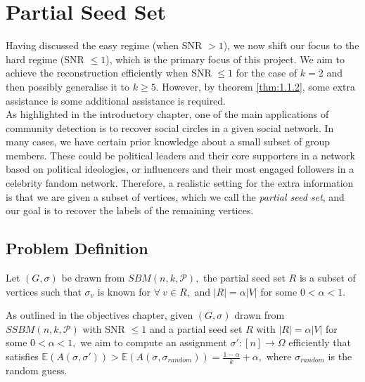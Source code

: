 \chapter{Partial Seed Set}\label{chapter:3}
Having discussed the easy regime (when SNR $>1$), we now shift our focus to the hard regime (SNR $\leq1$), which is the primary focus of this project. We aim to achieve the reconstruction efficiently when SNR $\leq1$ for the case of $k=2$ and then possibly generalise it to $k\geq 5$. However, by theorem \ref{thm:1.1.2}, some extra assistance is some additional assistance is required.\\
As highlighted in the introductory chapter, one of the main applications of community detection is to recover social circles in a given social network. In many cases, we have certain prior knowledge about a small subset of group members. These could be political leaders and their core supporters in a network based on political ideologies, or influencers and their most engaged followers in a celebrity fandom network. Therefore, a realistic setting for the extra information is that we are given a subset of vertices, which we call the \textit{partial seed set}, and our goal is to recover the labels of the remaining vertices.

\section{Problem Definition}
\begin{definition} \label{def: partial seed set}
    Let $(G, \sigma)$ be drawn from $SBM(n, k, \mathcal{P}),$ the partial seed set $R$ is a subset of vertices such that $\sigma_v$ is known for $\forall~v\in R,$ and $|R| = \alpha|V|$ for some $0<\alpha<1.$
\end{definition}
As outlined in the objectives chapter, given $(G, \sigma)$ drawn from $SSBM(n, k, \mathcal{P})$ with SNR $\leq1$ and a partial seed set $R$ with $|R|=\alpha|V|$ for some $0<\alpha<1,$ we aim to compute an assignment $\sigma': [n]\rightarrow \Omega$ efficiently that satisfies $\mathbb{E}(A(\sigma, \sigma'))> \mathbb{E}(A(\sigma, \sigma_{random}))=\frac{1-\alpha}{k}+\alpha,$ where $\sigma_{random}$ is the random guess.

